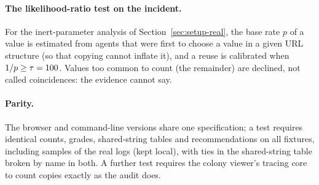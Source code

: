 \paragraph{The likelihood-ratio test on the incident.}
For the inert-parameter analysis of Section~\ref{sec:setup-real}, the base rate $p$ of a value is estimated from agents that were first to choose a value in a given URL structure (so that copying cannot inflate it), and a reuse is calibrated when $1/p\ge\tau=100{}$. Values too common to count (the remainder) are declined, not called coincidences: the evidence cannot say.

\paragraph{Parity.}
The browser and command-line versions share one specification; a test requires identical counts, grades, shared-string tables and recommendations on all fixtures, including samples of the real logs (kept local), with ties in the shared-string table broken by name in both. A further test requires the colony viewer's tracing core to count copies exactly as the audit does.

